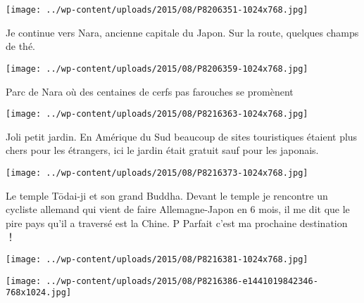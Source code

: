  

 

\begin{center} \texttt{[image: ../wp-content/uploads/2015/08/P8206351-1024x768.jpg]} \end{center}

 

 Je continue vers Nara, ancienne capitale du Japon. Sur la route, quelques champs de thé. 

 

\begin{center} \texttt{[image: ../wp-content/uploads/2015/08/P8206359-1024x768.jpg]} \end{center}

 

 Parc de Nara où des centaines de cerfs pas farouches se promènent 

 

\begin{center} \texttt{[image: ../wp-content/uploads/2015/08/P8216363-1024x768.jpg]} \end{center}

 

 Joli petit jardin. En Amérique du Sud beaucoup de sites touristiques étaient plus chers pour les étrangers, ici le jardin était gratuit sauf pour les japonais. 

 

\begin{center} \texttt{[image: ../wp-content/uploads/2015/08/P8216373-1024x768.jpg]} \end{center}

 

 Le temple Tōdai-ji et son grand Buddha. Devant le temple je rencontre un cycliste allemand qui vient de faire Allemagne-Japon en 6 mois, il me dit que le pire pays qu'il a traversé est la Chine. P Parfait c'est ma prochaine destination ！ 

 

\begin{center} \texttt{[image: ../wp-content/uploads/2015/08/P8216381-1024x768.jpg]} \end{center}

 

 

\begin{center} \texttt{[image: ../wp-content/uploads/2015/08/P8216386-e1441019842346-768x1024.jpg]} \end{center}


